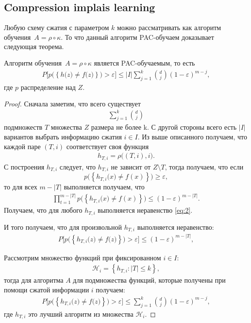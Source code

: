 \documentclass[../main.tex]{subfiles}
\begin{document}
\subsection{Compression implais learning}
Любую схему сжатия с параметром $k$ можно рассматривать как алгоритм обучения~$A = \rho \circ \kappa$. То что данный алгоритм PAC-обучаем доказывает следующая теорема.
\begin{theorem}
Алгоритм обучения~$A = \rho \circ \kappa$ является PAC-обучаемым, то есть
\[
\begin{aligned}
P\bigr[p\bigr(\left\{h\bigr(z\bigr)\not=f\bigr(z\bigr) \right\}\bigr)>\varepsilon\bigr] \leq |I|\sum_{j=1}^{k}{{d}\choose{j}}\left(1-\varepsilon\right)^{m-j},
\end{aligned}
\]
где $p$ распределение над $Z$.
\end{theorem}
\begin{proof}
Сначала заметим, что всего существует
\[
\begin{aligned}
\sum_{j=1}^{k}{{d}\choose{j}}
\end{aligned}
\]
подмножеств $T$ множества $Z$ размера не более k. С другой стороны всего есть $|I|$ вариантов выбрать информацию сжатия  $i \in I$.
Из выше описанного получаем, что каждой паре $\left(T, i\right)$ соответствует своя функция 
\[
\begin{aligned}
h_{T,i}=\rho\bigr(\left(T, i\right), i\bigr).
\end{aligned}
\]
С построения $h_{T, i}$ следует, что $h_{T, i}$ не зависит от $Z \setminus T$, тогда получаем, что если
\[
        p\bigr(\left\{h_{T,i}\bigr(x\bigr) \not=f(x)\right\}\bigr) \geq \varepsilon,
\]
то для всех $m -|T|$ выполняется получаем, что
\[
    \label{eq:2}
    \begin{aligned}
        \prod_{t=1}^{m-|T|}p\bigr(\left\{h_{T,i}\bigr(x\bigr) \not=f(x)\right\}\bigr) \leq \left(1-\varepsilon\right)^{m-|T|}.
    \end{aligned}
\]
Получаем, что для любого $h_{T, i}$ выполняется неравенство \eqref{eq:2}.

И того получаем, что для произвольной $h_{T, i}$ выполняется неравенство:
\[
\begin{aligned}
    P\bigr[p\bigr(\left\{h_{T, i}\bigr(z\bigr)\not=f\bigr(z\bigr) \right\}\bigr)>\varepsilon\bigr] \leq \left(1-\varepsilon\right)^{m-|T|},
\end{aligned}
\]

Рассмотрим множество функций при фиксированном $i \in I$:
\[
    \label{eq:3}
    \begin{aligned}
        \mathcal{H}_{i} = \left\{h_{T, i}: |T| \leq k\right\},
    \end{aligned}
\]
тогда для алгоритма $A$ для подмножества функций, которые получены при помощи сжатой информации $i$ получаем:
\[
\begin{aligned}
    \label{eq:4}
    P\bigr[p\bigr(\left\{h_{T, i}\bigr(z\bigr)\not=f\bigr(z\bigr) \right\}\bigr)>\varepsilon\bigr] \leq \sum_{j=1}^{k}{{d}\choose{j}}\left(1-\varepsilon\right)^{m-j},
\end{aligned}
\]
где $h_{T, i}$ это лучший алгоритм из множества $\mathcal{H}_{i}$.


\end{proof}
\end{document}
